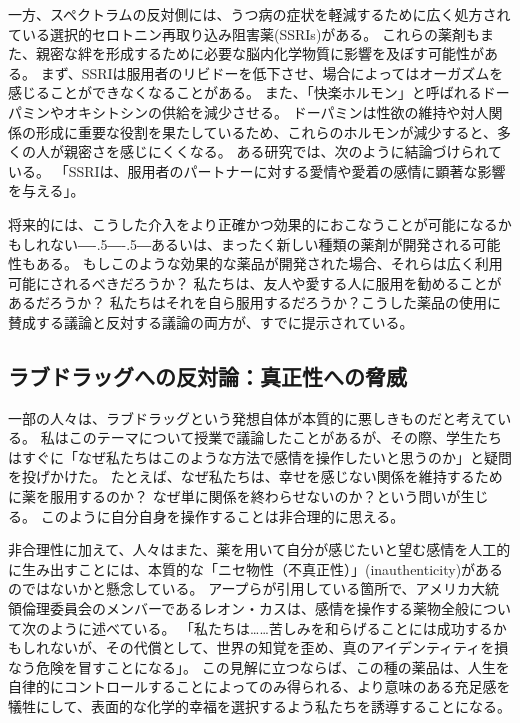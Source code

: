 \documentclass[paper=a4,book,openany]{jlreq}
\def\DDASH{―\kern-.5\zw―\kern-.5\zw―}
\begin{document}
一方、スペクトラムの反対側には、うつ病の症状を軽減するために広く処方されている選択的セロトニン再取り込み阻害薬(SSRIs)がある。
これらの薬剤もまた、親密な絆を形成するために必要な脳内化学物質に影響を及ぼす可能性がある。
まず、SSRIは服用者のリビドーを低下させ、場合によってはオーガズムを感じることができなくなることがある。
また、「快楽ホルモン」と呼ばれるドーパミンやオキシトシンの供給を減少させる。
ドーパミンは性欲の維持や対人関係の形成に重要な役割を果たしているため、これらのホルモンが減少すると、多くの人が親密さを感じにくくなる。
ある研究では、次のように結論づけられている。
「SSRIは、服用者のパートナーに対する愛情や愛着の感情に顕著な影響を与える」\citep{marazzitia14:_dimor_chang_some_featur_lovin}。

将来的には、こうした介入をより正確かつ効果的におこなうことが可能になるかもしれない{\DDASH}あるいは、まったく新しい種類の薬剤が開発される可能性もある。
もしこのような効果的な薬品が開発された場合、それらは広く利用可能にされるべきだろうか？ 私たちは、友人や愛する人に服用を勧めることがあるだろうか？ 私たちはそれを自ら服用するだろうか？こうした薬品の使用に賛成する議論と反対する議論の両方が、すでに提示されている。

\subsection{ラブドラッグへの反対論：真正性への脅威}

一部の人々は、ラブドラッグという発想自体が本質的に悪しきものだと考えている。
私はこのテーマについて授業で議論したことがあるが、その際、学生たちはすぐに「なぜ私たちはこのような方法で感情を操作したいと思うのか」と疑問を投げかけた。
たとえば、なぜ私たちは、幸せを感じない関係を維持するために薬を服用するのか？ なぜ単に関係を終わらせないのか？という問いが生じる。
このように自分自身を操作することは非合理的に思える。

非合理性に加えて、人々はまた、薬を用いて自分が感じたいと望む感情を人工的に生み出すことには、本質的な「ニセ物性（不真正性）」(inauthenticity)があるのではないかと懸念している。
アープらが引用している箇所で、アメリカ大統領倫理委員会のメンバーであるレオン・カスは、感情を操作する薬物全般について次のように述べている。
「私たちは……苦しみを和らげることには成功するかもしれないが、その代償として、世界の知覚を歪め、真のアイデンティティを損なう危険を冒すことになる」\citep[p.227]{kass03:_beyon_therap}。
この見解に立つならば、この種の薬品は、人生を自律的にコントロールすることによってのみ得られる、より意味のある充足感を犠牲にして、表面的な化学的幸福を選択するよう私たちを誘導することになる。
\end{document}
